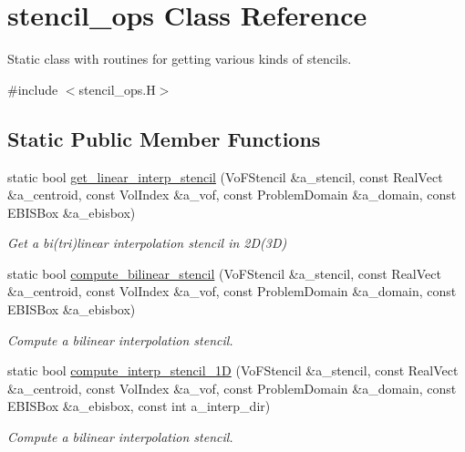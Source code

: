 \hypertarget{classstencil__ops}{}\section{stencil\+\_\+ops Class Reference}
\label{classstencil__ops}


Static class with routines for getting various kinds of stencils.  




{\ttfamily \#include $<$stencil\+\_\+ops.\+H$>$}

\subsection*{Static Public Member Functions}
\begin{DoxyCompactItemize}
\item 
static bool \hyperlink{classstencil__ops_a0da3f9f23f910e34f1614a4597e5489d}{get\+\_\+linear\+\_\+interp\+\_\+stencil} (Vo\+F\+Stencil \&a\+\_\+stencil, const Real\+Vect \&a\+\_\+centroid, const Vol\+Index \&a\+\_\+vof, const Problem\+Domain \&a\+\_\+domain, const E\+B\+I\+S\+Box \&a\+\_\+ebisbox)
\begin{DoxyCompactList}\small\item\em Get a bi(tri)linear interpolation stencil in 2D(3D) \end{DoxyCompactList}\item 
static bool \hyperlink{classstencil__ops_a7bca3e89bc07d2404e7cac8ef5ad7541}{compute\+\_\+bilinear\+\_\+stencil} (Vo\+F\+Stencil \&a\+\_\+stencil, const Real\+Vect \&a\+\_\+centroid, const Vol\+Index \&a\+\_\+vof, const Problem\+Domain \&a\+\_\+domain, const E\+B\+I\+S\+Box \&a\+\_\+ebisbox)
\begin{DoxyCompactList}\small\item\em Compute a bilinear interpolation stencil. \end{DoxyCompactList}\item 
static bool \hyperlink{classstencil__ops_a05acb57b1f7a5dd4b70bc39630b86bbb}{compute\+\_\+interp\+\_\+stencil\+\_\+1D} (Vo\+F\+Stencil \&a\+\_\+stencil, const Real\+Vect \&a\+\_\+centroid, const Vol\+Index \&a\+\_\+vof, const Problem\+Domain \&a\+\_\+domain, const E\+B\+I\+S\+Box \&a\+\_\+ebisbox, const int a\+\_\+interp\+\_\+dir)
\begin{DoxyCompactList}\small\item\em Compute a bilinear interpolation stencil. \end{DoxyCompactList}\item 

\end{DoxyCompactItemize}
